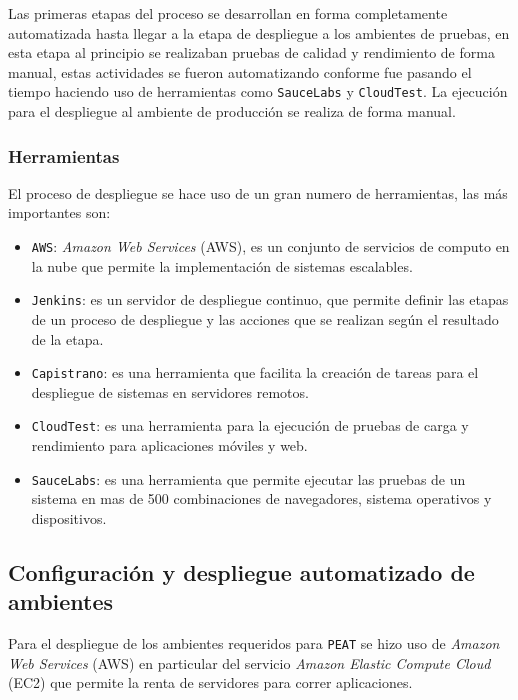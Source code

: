 
Las primeras etapas del proceso se desarrollan en forma completamente automatizada
hasta llegar a la etapa de despliegue a los ambientes de pruebas, en esta etapa
al principio se realizaban pruebas de calidad y rendimiento de forma manual, estas
actividades se fueron automatizando conforme fue pasando el tiempo haciendo uso de
herramientas como \texttt{SauceLabs} y \texttt{CloudTest}. La ejecución para
el despliegue al ambiente de producción se realiza de forma manual.

\subsubsection{Herramientas}

El proceso de despliegue se hace uso de un gran numero de herramientas, las más
importantes son:

\begin{itemize}
\item \texttt{AWS}: \textit{Amazon Web Services} (AWS), es un conjunto de servicios
  de computo en la nube que permite la implementación de sistemas escalables.
\item \texttt{Jenkins}: es un servidor de despliegue continuo, que permite
  definir las etapas de un proceso de despliegue y las acciones que se realizan
  según el resultado de la etapa.
\item \texttt{Capistrano}: es una herramienta que facilita la creación de tareas
  para el despliegue de sistemas en servidores remotos.
\item \texttt{CloudTest}: es una herramienta para la ejecución de pruebas de
  carga y rendimiento para aplicaciones móviles y web.
\item \texttt{SauceLabs}: es una herramienta que permite ejecutar las pruebas de un
  sistema en mas de 500 combinaciones de navegadores, sistema operativos
  y dispositivos.
\end{itemize}

\subsection{Configuración y despliegue automatizado de ambientes}

Para el despliegue de los ambientes requeridos para \texttt{PEAT} se hizo uso de
\textit{Amazon Web Services} (AWS) en particular del servicio
\textit{Amazon Elastic Compute Cloud} (EC2) que permite la renta de servidores
para correr aplicaciones.

